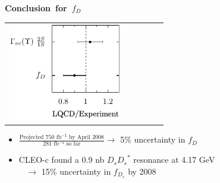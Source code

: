 \documentclass[landscape]{article}
\newenvironment{slide}[1][ ]{\mbox{\bf \boldmath #1 } \vfill}{\vfill \vspace{-1.5 cm} \mbox{ } \pagebreak}
\newenvironment{itemizer}[1]{\begin{itemize}\setlength{\itemsep}{#1}}{\end{itemize}}
\newcommand{\inv}{$^{\mathsf{-1}}$}
\begin{document}
\begin{slide}[Conclusion for $f_D$]

\begin{center}
  \begin{tabular}{p{0.4\linewidth} p{0.13\linewidth}}
    \begin{minipage}{\linewidth}
      \includegraphics[width=\linewidth]{new_ratio_plot2}
    \end{minipage} &
  \end{tabular}
\end{center}

\vfill

\begin{itemizer}{1 cm}

  \item $\frac{\mbox{Projected 750 fb\inv\ by April 2008}}{\mbox{281 fb\inv\ so far}} \to$ 5\% uncertainty in $f_D$

  \item CLEO-c found a 0.9 nb $D_s{D_s}^*$ resonance at 4.17 GeV \\
    \mbox{ } \hfill $\to$ 15\% uncertainty in $f_{D_s}$ by 2008

\end{itemizer}

\end{slide}
\end{document}
